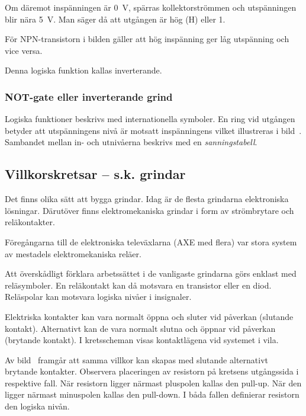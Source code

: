Om däremot inspänningen är \qty{0}{\volt}, spärras kollektorströmmen och
utspänningen blir nära \qty{5}{\volt}.
Man säger då att utgången är hög (H) eller 1.

För NPN-transistorn i bilden gäller att hög inspänning ger låg utspänning och
vice versa.

Denna logiska funktion kallas inverterande.

\subsubsection{NOT-gate eller inverterande grind}


Logiska funktioner beskrivs med internationella symboler.
En ring vid utgången betyder att utspänningens nivå är motsatt
inspänningens vilket illustreras i bild~.
Sambandet mellan in- och utnivåerna beskrivs med en \emph{sanningstabell}.


\subsection{Villkorskretsar -- s.k. grindar}

Det finns olika sätt att bygga grindar.
Idag är de flesta grindarna elektroniska lösningar.
Därutöver finns elektromekaniska grindar i form av strömbrytare och
reläkontakter.

Föregångarna till de elektroniska televäxlarna (AXE med flera) var stora system
av mestadels elektromekaniska reläer.

Att överskådligt förklara arbetssättet i de vanligaste grindarna görs enklast
med reläsymboler.
En reläkontakt kan då motsvara en transistor eller en diod.
Reläspolar kan motsvara logiska nivåer i insignaler.

Elektriska kontakter kan vara normalt öppna och sluter vid påverkan (slutande
kontakt).
Alternativt kan de vara normalt slutna och öppnar vid påverkan (brytande
kontakt).
I kretsscheman visas kontaktlägena vid systemet i vila.


Av bild~ framgår att samma villkor kan skapas med
slutande alternativt brytande kontakter.
Observera placeringen av resistorn på kretsens utgångssida i respektive fall.
När resistorn ligger närmast pluspolen kallas den pull-up.
När den ligger närmast minuspolen kallas den pull-down.
I båda fallen definierar resistorn den logiska nivån.

